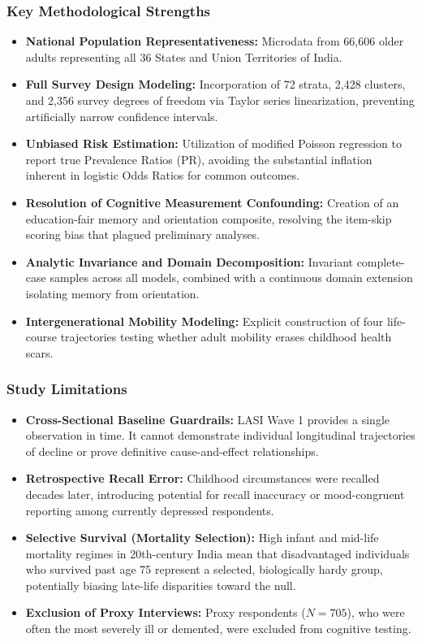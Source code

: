 \subsubsection{Key Methodological Strengths}
\begin{itemize}
    \item \textbf{National Population Representativeness:} Microdata from 66,606 older adults representing all 36 States and Union Territories of India.
    \item \textbf{Full Survey Design Modeling:} Incorporation of 72 strata, 2,428 clusters, and 2,356 survey degrees of freedom via Taylor series linearization, preventing artificially narrow confidence intervals.
    \item \textbf{Unbiased Risk Estimation:} Utilization of modified Poisson regression to report true Prevalence Ratios (PR), avoiding the substantial inflation inherent in logistic Odds Ratios for common outcomes.
    \item \textbf{Resolution of Cognitive Measurement Confounding:} Creation of an education-fair memory and orientation composite, resolving the item-skip scoring bias that plagued preliminary analyses.
    \item \textbf{Analytic Invariance and Domain Decomposition:} Invariant complete-case samples across all models, combined with a continuous domain extension isolating memory from orientation.
    \item \textbf{Intergenerational Mobility Modeling:} Explicit construction of four life-course trajectories testing whether adult mobility erases childhood health scars.
\end{itemize}

\subsubsection{Study Limitations}
\begin{itemize}
    \item \textbf{Cross-Sectional Baseline Guardrails:} LASI Wave 1 provides a single observation in time. It cannot demonstrate individual longitudinal trajectories of decline or prove definitive cause-and-effect relationships.
    \item \textbf{Retrospective Recall Error:} Childhood circumstances were recalled decades later, introducing potential for recall inaccuracy or mood-congruent reporting among currently depressed respondents.
    \item \textbf{Selective Survival (Mortality Selection):} High infant and mid-life mortality regimes in 20th-century India mean that disadvantaged individuals who survived past age 75 represent a selected, biologically hardy group, potentially biasing late-life disparities toward the null.
    \item \textbf{Exclusion of Proxy Interviews:} Proxy respondents ($N = 705$), who were often the most severely ill or demented, were excluded from cognitive testing.
\end{itemize}

